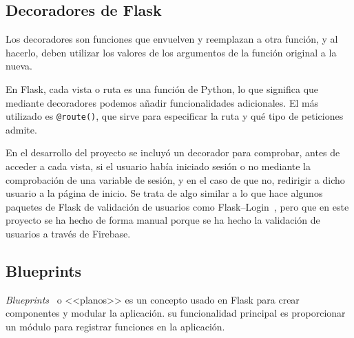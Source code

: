 \subsection{Decoradores de Flask}
Los decoradores son funciones que envuelven y reemplazan a otra función, y al hacerlo, deben utilizar los valores de los argumentos de la función original a la nueva.

En Flask, cada vista o ruta es una función de Python, lo que significa que mediante decoradores podemos añadir funcionalidades adicionales. El más utilizado es \texttt{@route()}, que sirve para especificar la ruta y qué tipo de peticiones admite. 



En el desarrollo del proyecto se incluyó un decorador para comprobar, antes de acceder a cada vista, si el usuario había iniciado sesión o no mediante la comprobación de una variable de sesión, y en el caso de que no, redirigir a dicho usuario a la página de inicio. Se trata de algo similar a lo que hace algunos paquetes de Flask de validación de usuarios como Flask--Login~\cite{doc-flask-login}, pero que en este proyecto se ha hecho de forma manual porque se ha hecho la validación de usuarios a través de Firebase.



\subsection{Blueprints}
\textit{Blueprints}~\cite{doc:blueprints} o <<planos>> es un concepto usado en Flask para crear componentes y modular la aplicación. su funcionalidad principal es proporcionar un módulo para registrar funciones en la aplicación.



